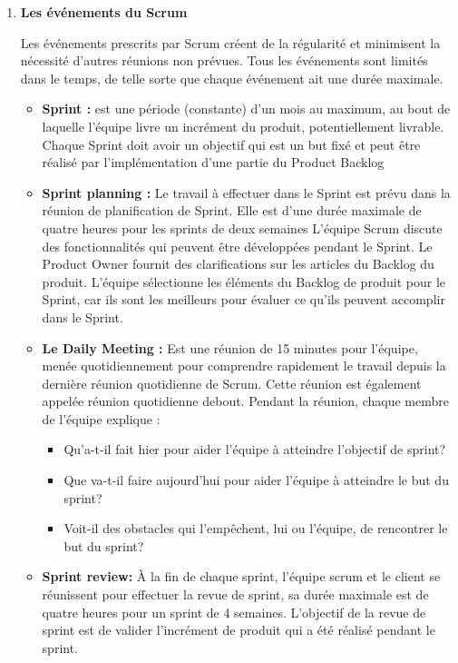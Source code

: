 \documentclass[11pt,a4paper]{article}
\begin{document}
\begin{enumerate}
\item \textbf{Les événements du Scrum}

Les événements prescrits par Scrum créent de la régularité et minimisent la nécessité d’autres réunions non prévues. Tous les événements sont limités dans le temps, de telle sorte que chaque événement ait une durée maximale. 

\begin{itemize}
\item \textbf{Sprint :} est une période (constante) d’un mois au maximum, au bout de laquelle l’équipe livre un incrément du produit, potentiellement livrable. Chaque Sprint doit avoir un objectif qui est un but fixé et peut être réalisé par l’implémentation d’une partie du Product Backlog

\item \textbf{Sprint planning :} Le travail à effectuer dans le Sprint est prévu dans la réunion de planification de Sprint. Elle est d'une durée maximale de quatre heures pour les sprints de deux semaines L'équipe Scrum discute des fonctionnalités qui peuvent être développées pendant le Sprint. Le Product Owner fournit des clarifications sur les articles du Backlog du produit. L'équipe sélectionne les éléments du Backlog de produit pour le Sprint, car ils sont les meilleurs pour évaluer ce qu'ils peuvent accomplir dans le Sprint.

\item \textbf{Le Daily Meeting :} Est une réunion de 15 minutes pour l'équipe, menée quotidiennement pour comprendre rapidement le travail depuis la dernière réunion quotidienne de Scrum. Cette réunion est également appelée réunion quotidienne debout. Pendant la réunion, chaque membre de l'équipe explique :

\begin{itemize}
\item Qu'a-t-il fait hier pour aider l'équipe à atteindre l'objectif de sprint?
\item Que va-t-il faire aujourd'hui pour aider l'équipe à atteindre le but du sprint?
\item Voit-il des obstacles qui l'empêchent, lui ou l'équipe, de rencontrer le but du sprint?
\end{itemize}
\item \textbf{Sprint review:} À la fin de chaque sprint, l'équipe scrum et le client se réunissent pour effectuer la revue de sprint, sa durée maximale est de quatre heures pour un sprint de 4 semaines. L'objectif de la revue de sprint est de valider l'incrément de produit qui a été réalisé pendant le sprint.


\end{itemize}
\end{enumerate}
\end{document}
